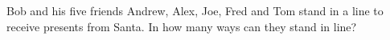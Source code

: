 Bob and his five friends Andrew, Alex, Joe, Fred and Tom stand in a line to receive presents from Santa. In how many ways can they stand in line?
